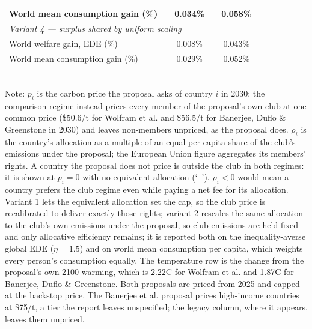 \begin{table}[htbp]
\begin{tabular}{lcccc}
  \quad World mean consumption gain (\%) &  & 0.034\% &  & 0.058\% \\
  \midrule
  \multicolumn{5}{l}{\textit{Variant 4 --- surplus shared by uniform scaling}} \\
  \quad World welfare gain, EDE (\%) &  & 0.008\% &  & 0.043\% \\
  \quad World mean consumption gain (\%) &  & 0.029\% &  & 0.052\% \\
  \bottomrule
\end{tabular}
\label{tab:equiv_rights_A}
\\[4pt]
{\footnotesize Note: $p_i$ is the carbon price the proposal asks of country $i$ in 2030; the comparison regime instead prices every member of the proposal's own club at one common price (\$50.6/t for Wolfram et al. and \$56.5/t for Banerjee, Duflo \& Greenstone in 2030) and leaves non-members unpriced, as the proposal does. $\rho_i$ is the country's allocation as a multiple of an equal-per-capita share of the club's emissions under the proposal; the European Union figure aggregates its members' rights. A country the proposal does not price is outside the club in both regimes: it is shown at $p_i=0$ with no equivalent allocation (`--'). $\rho_i < 0$ would mean a country prefers the club regime even while paying a net fee for its allocation. Variant 1 lets the equivalent allocation set the cap, so the club price is recalibrated to deliver exactly those rights; variant 2 rescales the same allocation to the club's own emissions under the proposal, so club emissions are held fixed and only allocative efficiency remains; it is reported both on the inequality-averse global EDE ($\eta=1.5$) and on world mean consumption per capita, which weights every person's consumption equally. The temperature row is the change from the proposal's own 2100 warming, which is 2.22\textdegree{}C for Wolfram et al. and 1.87\textdegree{}C for Banerjee, Duflo \& Greenstone. Both proposals are priced from 2025 and capped at the backstop price. The Banerjee et al. proposal prices high-income countries at \$75/t, a tier the report leaves unspecified; the legacy column, where it appears, leaves them unpriced.}
\end{table}
